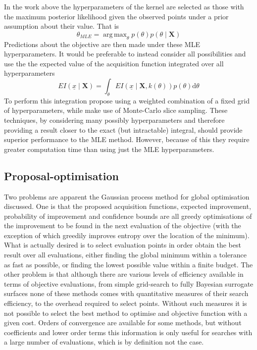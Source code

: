 \documentclass[a4paper, 10 pt, conference]{ieeeconf}  %
\DeclareMathOperator*{\argmax}{arg\,max}
\begin{document}
In the work above the hyperparameters of the kernel are selected as those with the maximum posterior likelihood given the observed points under a prior assumption about their value. That is
\begin{equation}
\theta_{MLE} = \argmax_{\theta} p(\theta)p(\theta \mid \mathbf{X})
\end{equation}
Predictions about the objective are then made under these MLE hyperparameters. It would be preferable to instead consider all possibilities and use the the expected value of the acquisition function integrated over all hyperparameters
\begin{equation}
EI(\underline{x} \mid \mathbf{X})  = \int_\theta EI(\underline{x} \mid \mathbf{X}, k(\theta)) p(\theta) \mathrm{d}\theta
\end{equation}
To perform this integration \cite{garnettgaussian} propose using a weighted combination of a fixed grid of hyperparameters, while \cite{murray2010slice} make use of Monte-Carlo slice sampling. These techniques, by considering many possibly hyperparameters and therefore providing a result closer to the exact (but intractable) integral, should provide superior performance to the MLE method. However, because of this they require greater computation time than using just the MLE hyperparameters.

\subsection{Proposal-optimisation}
Two problems are apparent the Gaussian process method for global optimisation discussed. One is that the proposed acquisition functions, expected improvement, probability of improvement and confidence bounds are all greedy optimisations of the improvement to be found in the next evaluation of the objective (with the exception of \cite{hennig2012entropy} which greedily improves entropy over the location of the minimum). What is actually desired is to select evaluation points in order obtain the best result over all evaluations, either finding the global minimum within a tolerance as fast as possible, or finding the lowest possible value within a finite budget. The other problem is that although there are various levels of efficiency available in terms of objective evaluations, from simple grid-search to fully Bayesian surrogate surfaces none of these methods comes with quantitative measures of their search efficiency, to the overhead required to select points. Without such measures it is not possible to select the best method to optimise and objective function with a given cost. Orders of convergence are available for some methods, but without coefficients and lower order terms this information is only useful for searches with a large number of evaluations, which is by definition not the case.
\end{document}

